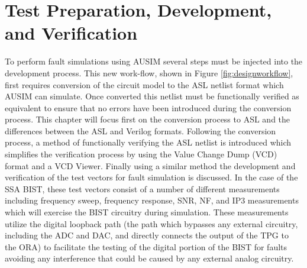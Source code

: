\documentclass[12pt]{report}
\begin{document}
\chapter{Test Preparation, Development, and Verification}
To perform fault simulations using AUSIM several steps must be injected into the development process.  This new work-flow, shown in Figure \ref{fig:designworkflow}, first requires conversion of the circuit model to the ASL netlist format which AUSIM can simulate.  Once converted this netlist must be functionally verified as equivalent to ensure that no errors have been introduced during the conversion process.  This chapter will focus first on the conversion process to ASL and the differences between the ASL and Verilog formats.  Following the conversion process, a method of functionally verifying the ASL netlist is introduced which simplifies the verification process by using the Value Change Dump (VCD) format and a VCD Viewer.  Finally using a similar method the development and verification of the test vectors for fault simulation is discussed.  In the case of the SSA BIST, these test vectors consist of a number of different measurements including frequency sweep, frequency response, SNR, NF, and IP3 measurements which will exercise the BIST circuitry during simulation.  These measurements utilize the digital loopback path (the path which bypasses any external circuitry, including the ADC and DAC, and directly connects the output of the TPG to the ORA) to facilitate the testing of the digital portion of the BIST for faults avoiding any interference that could be caused by any external analog circuitry. 
\end{document}
